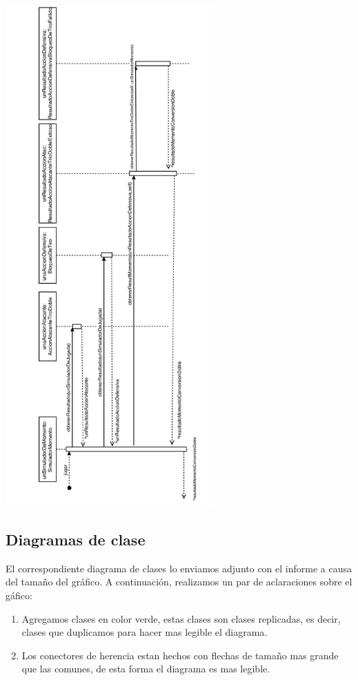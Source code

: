 \begin{center}
\includegraphics[width=8cm]{diagramas/secuencia}
\end{center}

\newpage

\subsection{Diagramas de clase}

El correspondiente diagrama de clases lo enviamos adjunto con el informe a causa del tamaño del gr\'afico. A continuación, realizamos un par de aclaraciones sobre el g\'afico:

\begin{enumerate}
  \item Agregamos clases en color verde, estas clases son clases replicadas, es decir, clases que duplicamos para hacer mas legible el diagrama.
  \item Los conectores de herencia estan hechos con flechas de tamaño mas grande que las comunes, de esta forma el diagrama es mas legible.
\end{enumerate}
